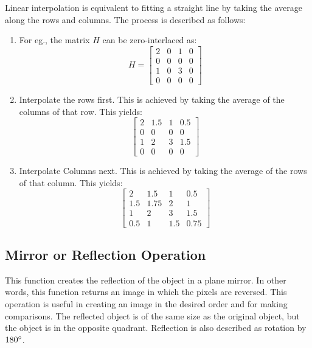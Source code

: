 Linear interpolation is equivalent to fitting a straight line by taking the average along the rows and columns.
The process is described as follows:
\begin{enumerate}
    \item For eg., the matrix $H$ can be zero-interlaced as:
        \begin{equation*}
            H = \begin{bmatrix}
                2 & 0 & 1 & 0\\
                0 & 0 & 0 & 0\\
                1 & 0 & 3 & 0\\
                0 & 0 & 0 & 0
            \end{bmatrix}
        \end{equation*}
    \item Interpolate the rows first. This is achieved by taking the average of the columns of that row. This yields:
        \begin{equation*}
            \begin{bmatrix}
                2 & 1.5 & 1 & 0.5\\
                0 & 0   & 0 & 0\\
                1 & 2   & 3 & 1.5\\
                0 & 0   & 0 & 0
            \end{bmatrix}
        \end{equation*}
    \item Interpolate Columns next. This is achieved by taking the average of the rows of that column. This yields:
        \begin{equation*}
            \begin{bmatrix}
                2   & 1.5  & 1   & 0.5\\
                1.5 & 1.75 & 2   & 1\\
                1   & 2    & 3   & 1.5\\
                0.5 & 1    & 1.5 & 0.75
            \end{bmatrix}
        \end{equation*}
\end{enumerate}

\subsection{Mirror or Reflection Operation}

This function creates the reflection of the object in a plane mirror. In other words, this function returns an image in which the pixels are reversed.
This operation is useful in creating an image in the desired order and for making comparisons.
The reflected object is of the same size as the original object, but the object is in the opposite quadrant.
Reflection is also described as rotation by $180\degree$.

